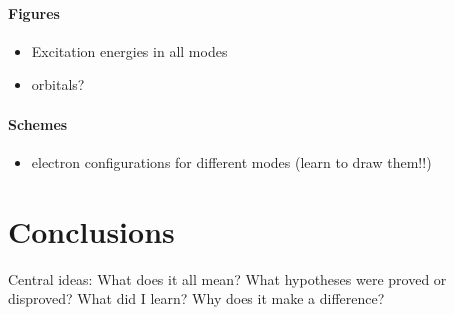 \documentclass[twoside,twocolumn,9pt]{article}
\renewcommand{\refname}{Notes and references}
\begin{document}
\paragraph*{Figures}
\begin{itemize}
    \item Excitation energies in all modes 
    \item orbitals?
\end{itemize}
\paragraph*{Schemes}
\begin{itemize}
  \item electron configurations for different modes (learn to draw them!!)
\end{itemize}



\section{Conclusions}

Central ideas: What does it all mean? What hypotheses were proved or disproved? What did I learn? Why does it make a difference?




\balance


\end{document}
